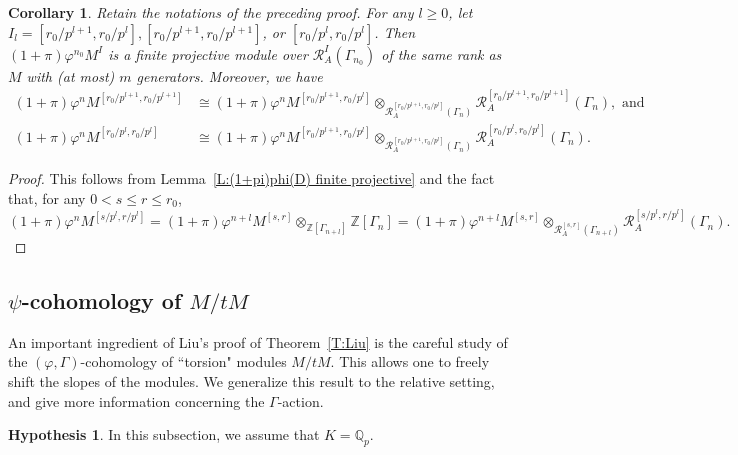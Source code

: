 \documentclass[12pt]{article}
\newtheorem{cor}[theorem]{Corollary}
\theoremstyle{definition}
\newtheorem{hypothesis}[theorem]{Hypothesis}
\numberwithin{equation}{theorem}
\newcommand{\calR}{\mathcal{R}}
\newcommand{\QQ}{\mathbb{Q}}
\newcommand{\ZZ}{\mathbb{Z}}
\def\Qp{\QQ_p}
\begin{document}
\begin{cor}
\label{C:structure of 1+pi varphi^n}
Retain the notations of the preceding proof.
For any $l \geq 0$, let $I_l = [r_0/p^{l+1}, r_0/p^l], [r_0/p^{l+1}, r_0/p^{l+1}]$, or $[r_0/p^l,r_0/p^l]$.
Then $(1+\pi)\varphi^{n_0} M^I$ is a finite projective module over $\calR_A^{I}(\Gamma_{n_0})$ of the same rank as $M$ with (at most) $m$ generators.  Moreover, we have
\begin{align*}
(1+\pi)\varphi^n M^{[r_0/p^{l+1}, r_0/p^{l+1}]} &\cong
(1+\pi)\varphi^n M^{[r_0/p^{l+1}, r_0/p^l]} \otimes_{\calR_A^{[r_0/p^{l+1}, r_0/p^l]}(\Gamma_n)} \calR_A^{[r_0/p^{l+1}, r_0/p^{l+1}]}(\Gamma_n),\textrm{ and }\\
(1+\pi)\varphi^n M^{[r_0/p^l,r_0/p^l]} &\cong
(1+\pi)\varphi^n M^{[r_0/p^{l+1}, r_0/p^l]} \otimes_{\calR_A^{[r_0/p^{l+1}, r_0/p^l]}(\Gamma_n)} \calR_A^{[r_0/p^l,r_0/p^l]}(\Gamma_n).
\end{align*}
\end{cor}
\begin{proof}
This follows from Lemma~\ref{L:(1+pi)phi(D) finite projective} and the fact that, for any $0 <s \leq r\leq r_0$, 
\[
(1+\pi) \varphi^{n} M^{[s/p^l, r/p^l]} = (1+\pi)\varphi^{n+l} M^{[s,r]} \otimes_{\ZZ[\Gamma_{n+l}]} \ZZ[\Gamma_{n}] = (1+\pi)\varphi^{n+l} M^{[s,r]} \otimes_{\calR_A^{[s,r]}(\Gamma_{n+l})} \calR_A^{[s/p^l, r/p^l]}(\Gamma_{n}).
\]
\end{proof}


\subsection{$\psi$-cohomology of $M / tM$}

An important ingredient of Liu's proof \cite{liu} of Theorem~\ref{T:Liu} is the careful study of the $(\varphi, \Gamma)$-cohomology of ``torsion" modules $M/tM$.  This allows one to freely shift the slopes of the modules.  We  generalize this result to the relative setting, and give more information concerning the $\Gamma$-action.

\begin{hypothesis}
In this subsection, we assume that $K = \Qp$.
\end{hypothesis}
\end{document}
